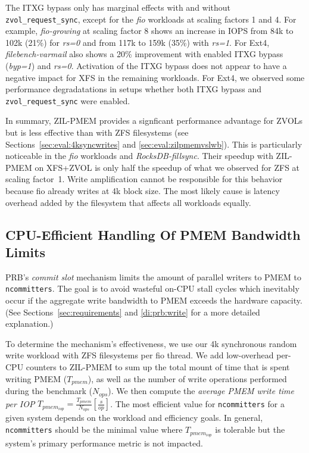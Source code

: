\documentclass[12pt,a4paper,twoside]{book}
\begin{document}
The ITXG bypass only has marginal effects with and without \lstinline{zvol_request_sync}, except for the \textit{fio} workloads at scaling factors 1 and 4.
For example, \textit{fio-growing} at scaling factor 8 shows an increase in IOPS from 84k to 102k (21\%) for \textit{rs=0} and from 117k to 159k (35\%) with \textit{rs=1}.
For Ext4, \textit{filebench-varmail} also shows a 20\% improvement with enabled ITXG bypass (\textit{byp=1}) and \textit{rs=0}.
Activation of the ITXG bypass does not appear to have a negative impact for XFS in the remaining workloads.
For Ext4, we observed some performance degradatations in setups whether both ITXG bypass and \lstinline{zvol_request_sync} were enabled.

In summary, ZIL-PMEM provides a signficant performance advantage for ZVOLs but is less effective than with ZFS filesystems (see Sections~\ref{sec:eval:4ksyncwrites} and \ref{sec:eval:zilpmemvslwb}).
This is particularly noticeable in the \textit{fio} workloads and \textit{RocksDB-fillsync}.
Their speedup with ZIL-PMEM on XFS+ZVOL is only half the speedup of what we observed for ZFS at scaling factor~1.
Write amplification cannot be responsible for this behavior because fio already writes at 4k block size.
The most likely cause is latency overhead added by the filesystem that affects all workloads equally.

\subsection{CPU-Efficient Handling Of PMEM Bandwidth Limits}\label{sec:eval:ncommitters_scalability}

PRB's \textit{commit slot} mechanism limits the amount of parallel writers to PMEM to \lstinline{ncommitters}.
The goal is to avoid wasteful on-CPU stall cycles which inevitably occur if the aggregate write bandwidth to PMEM exceeds the hardware capacity.
(See Sections~\ref{sec:requirements} and \ref{di:prb:write} for a more detailed explanation.)

To determine the mechanism's effectiveness, we use our 4k synchronous random write workload with \underline{} ZFS filesystems per fio thread.
We add low-overhead per-CPU counters to ZIL-PMEM to sum up the total mount of time that is spent writing PMEM ($T_{pmem}$), as well as the number of write operations performed during the benchmark ($N_{ops}$).
We then compute the \textit{average PMEM write time per IOP} $T_{pmem_{iop}} = \frac{T_{pmem}}{N_{ops}} [\frac{s}{op}]$.
The most efficient value for \lstinline{ncommitters} for a given system depends on the workload and efficiency goals.
In general, \lstinline{ncommitters} should be the minimal value where $T_{pmem_{iop}}$ is tolerable but the system's primary performance metric is not impacted.
\end{document}
